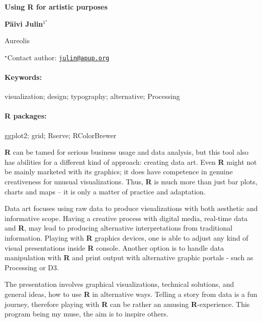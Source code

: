 \documentclass[11pt, a4paper]{article}
\renewcommand{\title}[1]{\begin{center}{\bf \LARGE #1}\end{center}}
\newcommand{\keywords}{\paragraph{Keywords:}}
\newcommand{\packages}{\paragraph{R packages:}}
\begin{document}
\pagestyle{empty}

\title{Using R for artistic purposes}

\begin{center}
  {\bf Päivi Julin$^{1^\star}$}
\end{center}

\vskip 0.3cm

\begin{affiliations}
\begin{enumerate}
\begin{minipage}{0.915\textwidth}
\centering
\item Aureolis \\[-2pt]
\end{minipage}
\end{enumerate}
$^\star$Contact author: \href{mailto:julin@apup.org}{\nolinkurl{julin@apup.org}}\\
\end{affiliations}

\vskip 0.5cm

\begin{minipage}{0.915\textwidth}
\keywords visualization; design; typography; alternative; Processing
\packages ggplot2; grid; Rserve; RColorBrewer
\end{minipage}

\vskip 0.8cm

\textbf{R} can be tamed for serious business usage and data analysis,
but this tool also has abilities for a different kind of approach:
creating data art. Even \textbf{R} might not be mainly marketed with its
graphics; it does have competence in genuine creativeness for unusual
visualizations. Thus, \textbf{R} is much more than just bar plots,
charts and maps -- it is only a matter of practice and adaptation.

Data art focuses using raw data to produce visualizations with both
aesthetic and informative scope. Having a creative process with digital
media, real-time data and \textbf{R}, may lead to producing alternative
interpretations from traditional information. Playing with \textbf{R}
graphics devices, one is able to adjust any kind of visual presentations
inside \textbf{R} console. Another option is to handle data manipulation
with \textbf{R} and print output with alternative graphic portals - such
as Processing or D3.

The presentation involves graphical visualizations, technical solutions,
and general ideas, how to use \textbf{R} in alternative ways. Telling a
story from data is a fun journey, therefore playing with \textbf{R} can
be rather an amusing \textbf{R}-experience. This program being my muse,
the aim is to inspire others.
\end{document}
